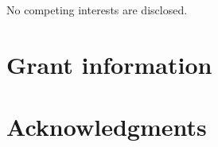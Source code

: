 \documentclass[9pt,a4paper]{extarticle}
\begin{document}
No competing interests are disclosed.

\section*{Grant information}

\section*{Acknowledgments}



\nocite{*}
{\small
}







\end{document}
